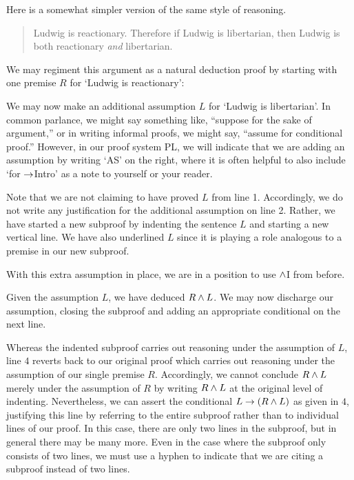 Here is a somewhat simpler version of the same style of reasoning.
	\begin{quote}
		Ludwig is reactionary. Therefore if Ludwig is libertarian, then Ludwig is both reactionary \emph{and} libertarian.
	\end{quote}
We may regiment this argument as a natural deduction proof by starting with one premise $R$ for `Ludwig is reactionary':
	\begin{fitchproof}
		 \pr{}
	\end{fitchproof}
We may now make an additional assumption $L$ for `Ludwig is libertarian'.
In common parlance, we might say something like, ``suppose for the sake of argument,'' or in writing informal proofs, we might say, ``assume for conditional proof.''
However, in our proof system PL, we will indicate that we are adding an assumption by writing `AS' on the right, where it is often helpful to also include `for $\rightarrow$Intro' as a note to yourself or your reader.
	\begin{fitchproof}
		 \pr{}
		\open
			 \as{for \eif Intro}{}
	\end{fitchproof}

Note that we are not claiming to have proved $L$ from line 1.
Accordingly, we do not write any justification for the additional assumption on line 2.
Rather, we have started a new subproof by indenting the sentence $L$ and starting a new vertical line.
We have also underlined $L$ since it is playing a role analogous to a premise in our new subproof. 

With this extra assumption in place, we are in a position to use $\wedge$I from before.
	\begin{fitchproof}
		 \pr{}
		\open
			 
			\ai{r, l}
	\end{fitchproof}
Given the assumption $L$, we have deduced $R \wedge L$.
We may now discharge our assumption, closing the subproof and adding an appropriate conditional on the next line.
	\begin{fitchproof}
		 \pr{}
		\open
			 \as{for \eif Intro}{}
			\ai{r, l}
			\close
		\ci{l-rl}
	\end{fitchproof}
Whereas the indented subproof carries out reasoning under the assumption of $L$, line $4$ reverts back to our original proof which carries out reasoning under the assumption of our single premise $R$.
Accordingly, we cannot conclude $R\wedge L$ merely under the assumption of $R$ by writing $R\wedge L$ at the original level of indenting.
Nevertheless, we can assert the conditional $L\rightarrow(R\wedge L)$ as given in $4$, justifying this line by referring to the entire subproof rather than to individual lines of our proof.
In this case, there are only two lines in the subproof, but in general there may be many more.
Even in the case where the subproof only consists of two lines, we must use a hyphen to indicate that we are citing a subproof instead of two lines.

